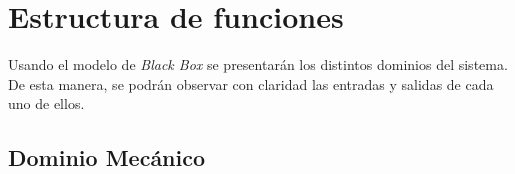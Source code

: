 \egroup

\section{Estructura de funciones}
Usando el modelo de {\it Black Box} se presentarán los distintos dominios del sistema. De esta manera, se podrán observar con claridad las entradas y salidas de cada uno de ellos.

\subsection{Dominio Mecánico}
